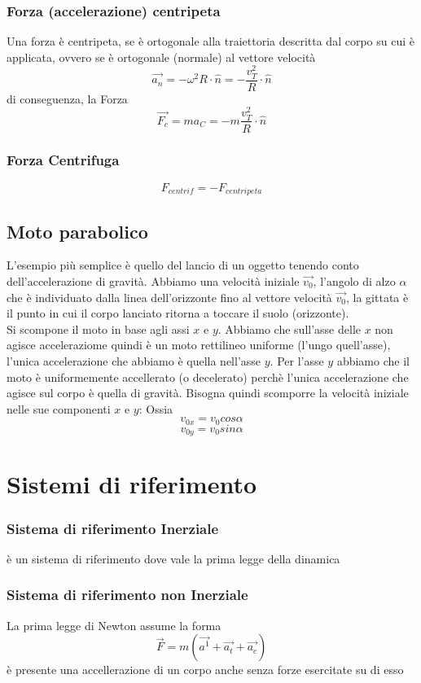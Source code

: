 \documentclass[a4paper]{report}
\begin{document}
  \subsection{Forza (accelerazione) centripeta}
  Una forza è centripeta, se è ortogonale alla traiettoria descritta dal corpo su cui è applicata, ovvero se è ortogonale (normale) al vettore velocità
  $$ \vec{a_n} = -\omega^2 R \cdot \hat{n} = -\frac{v_T^2}{R} \cdot \hat{n} $$
  di conseguenza, la Forza
  $$ \vec{F_c} = ma_C =  -m\frac{v_T^2}{R} \cdot \hat{n}$$

  \subsection{Forza Centrifuga}
  $$ F_{centrif} = - F_{centripeta} $$


  \section{Moto parabolico}
  L'esempio più semplice è quello del lancio di un oggetto tenendo conto dell'accelerazione di gravità. Abbiamo una velocità iniziale $\vec{v_0}$, l'angolo di alzo $\alpha$ che è individuato dalla linea dell'orizzonte fino al vettore velocità $\vec{v_0}$, la gittata è il punto in cui il corpo lanciato ritorna a toccare il suolo (orizzonte).\\
  Si scompone il moto in base agli assi $x$ e $y$. Abbiamo che sull'asse delle $x$ non agisce acceleraziome quindi è un moto rettilineo uniforme (l'ungo quell'asse), l'unica accelerazione che abbiamo è quella nell'asse $y$.
  Per l'asse $y$ abbiamo che il moto è uniformemente accellerato (o decelerato) perchè l'unica accelerazione che agisce sul corpo è quella di gravità.
  Bisogna quindi scomporre la velocità iniziale nelle sue componenti $x$ e $y$: Ossia
  $$v_{0x} = v_0 cos\alpha$$
  $$v_{0y} = v_0 sin\alpha$$


  \chapter{Sistemi di riferimento}
  \subsection{Sistema di riferimento Inerziale}
  è un sistema di riferimento dove vale la prima legge della dinamica
  \subsection{Sistema di riferimento non Inerziale}
  La prima legge di Newton assume la forma
  $$ \vec{F} = m(\vec{a^1} + \vec{a_t} + \vec{a_c}) $$
  è presente una accellerazione di un corpo anche senza forze esercitate su di esso
\end{document}
